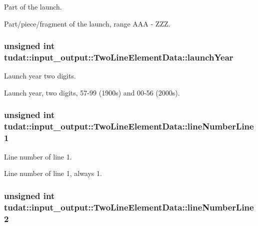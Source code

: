 Part of the launch. 

Part/piece/fragment of the launch, range A\+AA -\/ Z\+ZZ. 
\subsubsection[{\texorpdfstring{launch\+Year}{launchYear}}]{\setlength{\rightskip}{0pt plus 5cm}unsigned int tudat\+::input\+\_\+output\+::\+Two\+Line\+Element\+Data\+::launch\+Year}\hypertarget{structtudat_1_1input__output_1_1TwoLineElementData_aa2a801237c023f174ab3c54840242062}{}\label{structtudat_1_1input__output_1_1TwoLineElementData_aa2a801237c023f174ab3c54840242062}


Launch year two digits. 

Launch year, two digits, 57-\/99 (1900s) and 00-\/56 (2000s). 
\subsubsection[{\texorpdfstring{line\+Number\+Line1}{lineNumberLine1}}]{\setlength{\rightskip}{0pt plus 5cm}unsigned int tudat\+::input\+\_\+output\+::\+Two\+Line\+Element\+Data\+::line\+Number\+Line1}\hypertarget{structtudat_1_1input__output_1_1TwoLineElementData_a2b126f26169e05bb86bf0cec79a47827}{}\label{structtudat_1_1input__output_1_1TwoLineElementData_a2b126f26169e05bb86bf0cec79a47827}


Line number of line 1. 

Line number of line 1, always \textquotesingle{}1\textquotesingle{}. 
\subsubsection[{\texorpdfstring{line\+Number\+Line2}{lineNumberLine2}}]{\setlength{\rightskip}{0pt plus 5cm}unsigned int tudat\+::input\+\_\+output\+::\+Two\+Line\+Element\+Data\+::line\+Number\+Line2}\hypertarget{structtudat_1_1input__output_1_1TwoLineElementData_a4b2bf73802411d362f0ccb5ed7fe31b9}{}\label{structtudat_1_1input__output_1_1TwoLineElementData_a4b2bf73802411d362f0ccb5ed7fe31b9}



